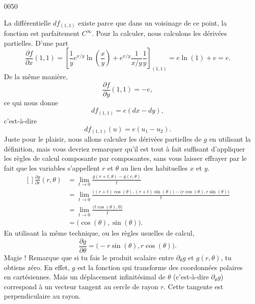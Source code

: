 
\begin{corrige}{0050}

La différentielle $df_{(1,1)}$ existe parce que dans un voisinage de ce point, la fonction est parfaitement $ C^{\infty}$. Pour la calculer, nous calculons les dérivées partielles. D'une part
\begin{equation}
	\frac{ \partial f }{ \partial x }(1,1)=\left[ \frac{1}{ y } e^{x/y}\ln(\frac{ x }{ y })+ e^{x/y}\frac{1}{ x/y }\frac{1}{ y } \right]_{(1,1)}=e\ln(1)+e=e.
\end{equation}
De la même manière,
\begin{equation}
	\frac{ \partial f }{ \partial y }(1,1)=-e,
\end{equation}
ce qui nous donne
\begin{equation}
	df_{(1,1)}=e(dx-dy),
\end{equation}
c'est-à-dire
\begin{equation}
	df_{(1,1)}(u)=e(u_1-u_2).
\end{equation}
Juste pour le plaisir, nous allons calculer les dérivées partielles de $g$ en utilisant la définition, mais vous devriez remarquer qu'il est tout à fait suffisant d'appliquer les règles de calcul composante par composantes, sans vous laisser effrayer par le fait que les variables s'appellent $r$ et $\theta$ au lieu des habituelles $x$ et $y$.
\begin{equation}
	\begin{aligned}[]
		\frac{ \partial g }{ \partial r }(r,\theta)
			&=	\lim_{t\to 0}\frac{ g(r+t,\theta)-g(r,\theta) }{ t }\\
			&=	\lim_{t\to 0}\frac{ \big( (r+t)\cos(\theta),(r+t)\sin(\theta) \big)-\big( r\cos(\theta),r\sin(\theta) \big) }{ t }\\
			&=	\lim_{t\to 0}\frac{ \big( t\cos(\theta),0 \big) }{ t }\\
			&=	\big( \cos(\theta),\sin(\theta) \big).
	\end{aligned}
\end{equation}
En utilisant la même technique, ou les règles usuelles de calcul,
\begin{equation}
	\frac{ \partial g }{ \partial \theta }=\big( -r\sin(\theta),r\cos(\theta) \big).
\end{equation}
Magie ! Remarque que si tu fais le produit scalaire entre $\partial_{\theta}g$ et $g(r,\theta)$, tu obtiens zéro. En effet, $g$ est la fonction qui transforme des coordonnées polaires en cartésiennes. Mais un déplacement infinitésimal de $\theta$ (c'est-à-dire $\partial_{\theta}g$) correspond à un vecteur tangent au cercle de rayon $r$. Cette tangente est perpendiculaire au rayon.


\end{corrige}
